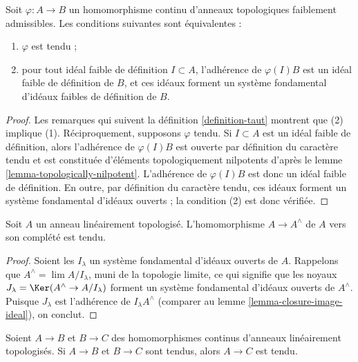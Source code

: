 \begin{lemma}
\label{lemma-taut-weakly-admissible}
Soit $\varphi : A \to B$ un homomorphisme continu d'anneaux topologiques
faiblement admissibles. Les conditions suivantes sont équivalentes :
\begin{enumerate}
\item $\varphi$ est tendu ;
\item pour tout idéal faible de définition $I \subset A$, l'adhérence de
$\varphi(I)B$ est un idéal faible de définition de $B$, et ces idéaux forment un
système fondamental d'idéaux faibles de définition de $B$.
\end{enumerate}
\end{lemma}

\begin{proof}
Les remarques qui suivent la définition \ref{definition-taut} montrent que
(2) implique (1). Réciproquement, supposons $\varphi$ tendu. Si $I \subset A$
est un idéal faible de définition, alors l'adhérence de $\varphi(I)B$
est ouverte par définition du caractère tendu et est constituée d'éléments topologiquement
nilpotents d'après le lemme \ref{lemma-topologically-nilpotent}.
L'adhérence de $\varphi(I)B$ est donc un idéal faible de définition.
En outre, par définition du caractère tendu, ces idéaux forment un
système fondamental d'idéaux ouverts ; la condition (2) est donc vérifiée.
\end{proof}

\begin{lemma}
\label{lemma-completion-taut}
Soit $A$ un anneau linéairement topologisé. L'homomorphisme $A \to A^\wedge$
de $A$ vers son complété est tendu.
\end{lemma}

\begin{proof}
Soient les $I_\lambda$ un système fondamental d'idéaux ouverts de $A$.
Rappelons que $A^\wedge = \lim A/I_\lambda$, muni de la topologie limite,
ce qui signifie que les noyaux $J_\lambda = \Ker(A^\wedge \to A/I_\lambda)$
forment un système fondamental d'idéaux ouverts de $A^\wedge$.
Puisque $J_\lambda$ est l'adhérence de $I_\lambda A^\wedge$
(comparer au lemme \ref{lemma-closure-image-ideal}), on conclut.
\end{proof}

\begin{lemma}
\label{lemma-composition-taut}
Soient $A \to B$ et $B \to C$ des homomorphismes continus d'anneaux
linéairement topologisés. Si $A \to B$ et $B \to C$ sont tendus, alors
$A \to C$ est tendu.
\end{lemma}

